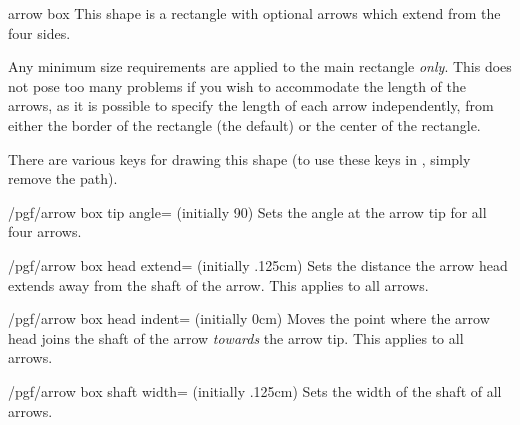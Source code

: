 \begin{shape}{arrow box}
    This shape is a rectangle with optional arrows which extend from the four
    sides.
\begin{codeexample}[preamble={\usetikzlibrary{shapes.arrows}}]
\end{codeexample}

    Any minimum size requirements are applied to the main rectangle
    \emph{only}. This does not pose too many problems if you wish to
    accommodate the length of the arrows, as it is possible to specify the
    length of each arrow independently, from either the border of the rectangle
    (the default) or the center of the rectangle.
\begin{codeexample}[preamble={\usetikzlibrary{shapes.arrows}}]
\end{codeexample}

    There are various \pgfname{} keys for drawing this shape (to use these keys
    in \tikzname, simply remove the  path).

\begin{key}{/pgf/arrow box tip angle= (initially 90)}
    Sets the angle at the arrow tip for all four arrows.
\end{key}

\begin{key}{/pgf/arrow box head extend= (initially .125cm)}
    Sets the distance the arrow head extends away from the shaft of the arrow.
    This applies to all arrows.
\end{key}

\begin{key}{/pgf/arrow box head indent= (initially 0cm)}
    Moves the point where the arrow head joins the shaft of the arrow
    \emph{towards} the arrow tip. This applies to all arrows.
\end{key}

\begin{key}{/pgf/arrow box shaft width= (initially .125cm)}
    Sets the width of the shaft of all arrows.
\end{key}


\end{shape}
